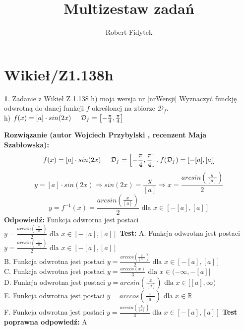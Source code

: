 \documentclass[12pt, a4paper]{article}
\title{Multizestaw zadań}
\author{Robert Fidytek}
\date{}
\theoremstyle{definition} %
\newtheorem{zad}{}
\newcommand{\kategoria}[1]{\section{#1}} %
\newcommand{\zadStart}[1]{\begin{zad}#1\newline} %
\newcommand{\zadStop}{\end{zad}}   %
\newcommand{\rozwStart}[2]{\noindent \textbf{Rozwiązanie (autor #1 , recenzent #2): }\newline} %
\newcommand{\rozwStop}{\newline}                                            %
\newcommand{\odpStart}{\noindent \textbf{Odpowiedź:}\newline}    %
\newcommand{\odpStop}{\newline}                                             %
\newcommand{\testStart}{\noindent \textbf{Test:}\newline} %
\newcommand{\testStop}{\newline} %
\newcommand{\kluczStart}{\noindent \textbf{Test poprawna odpowiedź:}\newline} %
\newcommand{\kluczStop}{\newline} %
\begin{document}
\maketitle


\kategoria{Wikieł/Z1.138h}
\zadStart{Zadanie z Wikieł Z 1.138 h) moja wersja nr [nrWersji]}
Wyznaczyć funckję odwrotną do danej funkcji $f$ określonej na zbiorze $\mathcal{D}_{f}$.\\
h) $f(x)=[a]\cdot sin(2x)\hspace{5mm}\mathcal{D}_{f}=\left[-\frac{\pi}{4},\frac{\pi}{4}\right]$
\zadStop
\rozwStart{Wojciech Przybylski}{Maja Szabłowska}
$$f(x)=[a]\cdot sin(2x)\hspace{5mm} \mathcal{D}_{f}=\left[-\frac{\pi}{4},\frac{\pi}{4}\right], f(\mathcal{D}_{f})=[-[a],[a]]$$
$$y=[a]\cdot sin(2x)\Rightarrow sin(2x)=\frac{y}{[a]} \Rightarrow x=\frac{arcsin\left(\frac{y}{[a]}\right)}{2}$$
$$y=f^{-1}(x)=\frac{arcsin\left(\frac{x}{[a]}\right)}{2} \mbox{ dla } x\in [-[a],[a]]$$
\rozwStop
\odpStart
Funkcja odwrotna jest postaci $y=\frac{arcsin\left(\frac{x}{[a]}\right)}{2}  \mbox{ dla }x\in[-[a],[a]]$
\odpStop
\testStart
A. Funkcja odwrotna jest postaci $y=\frac{arcsin\left(\frac{x}{[a]}\right)}{2}   \mbox{ dla }x\in[-[a],[a]]$\\
B. Funkcja odwrotna jest postaci $y=\frac{arccos\left(\frac{x}{[a]}\right)}{2}  \mbox{ dla }x\in[-[a],[a]]$\\
C. Funkcja odwrotna jest postaci $y=\frac{arccos(x)}{3} \mbox{ dla }x\in(-\infty,-[a]]$\\
D. Funkcja odwrotna jest postaci $y=arcsin\left(\frac{x}{[a]}\right)  \mbox{ dla }x\in[[a],\infty)$\\
E. Funkcja odwrotna jest postaci $y=arccos\left(\frac{x}{[a]}\right) \mbox{ dla }x\in \mathbb{R}$\\
F. Funkcja odwrotna jest postaci $y=\frac{arcsin\left(\frac{x}{[a]}\right)}{3} \mbox{ dla }x\in[-[a],[a]]$
\testStop
\kluczStart
A
\kluczStop
\end{document}
